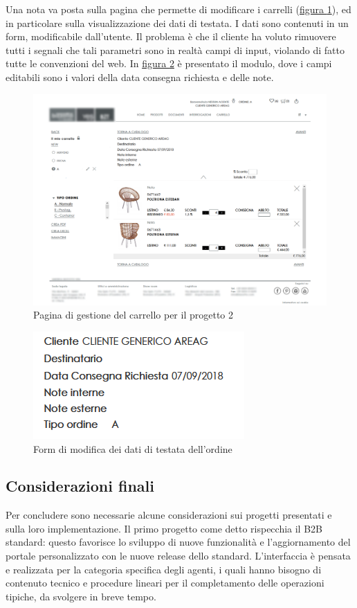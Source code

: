 Una nota va posta sulla pagina che permette di modificare i carrelli (\hyperref[fig:carrello-2]{figura \ref{fig:carrello-2}}), ed in particolare sulla visualizzazione dei dati di testata. I dati sono contenuti in un form, modificabile dall'utente. Il problema è che il cliente ha voluto rimuovere tutti i segnali che tali parametri sono in realtà campi di input, violando di fatto tutte le convenzioni del web. In \hyperref[fig:carrello-form]{figura \ref{fig:carrello-form}} è presentato il modulo, dove i campi editabili sono i valori della data consegna richiesta e delle note.
\begin{figure}[H]
	\centering
	\includegraphics[width=\linewidth]{Immagini/p2/carrello.png}
	\caption{Pagina di gestione del carrello per il progetto 2}
	\label{fig:carrello-2}
\end{figure}
\begin{figure}[H]
	\centering
	\includegraphics[width=0.5\linewidth]{Immagini/p2/carrello-form.png}
	\caption{Form di modifica dei dati di testata dell'ordine}
	\label{fig:carrello-form}
\end{figure}

\subsection{Considerazioni finali}
Per concludere sono necessarie alcune considerazioni sui progetti presentati e sulla loro implementazione. Il primo progetto come detto rispecchia il B2B standard: questo favorisce lo sviluppo di nuove funzionalità e l'aggiornamento del portale personalizzato con le nuove release dello standard. L'interfaccia è pensata e realizzata per la categoria specifica degli agenti, i quali hanno bisogno di contenuto tecnico e procedure lineari per il completamento delle operazioni tipiche, da svolgere in breve tempo.

